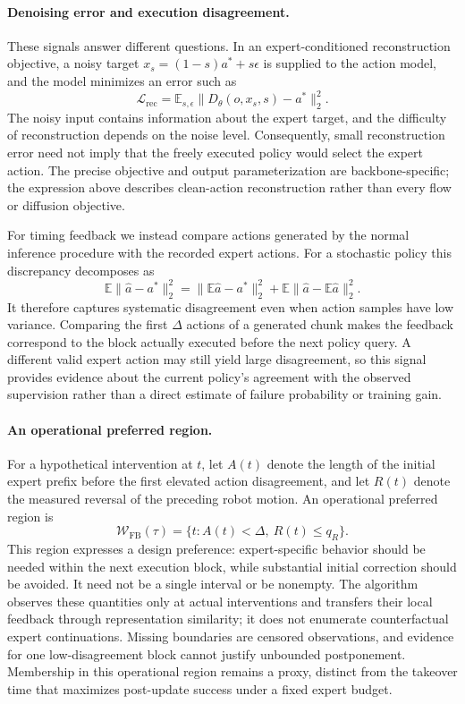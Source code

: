 \paragraph{Denoising error and execution disagreement.}
These signals answer different questions. In an expert-conditioned
reconstruction objective, a noisy target
$x_s=(1-s)a^*+s\epsilon$ is supplied to the action model, and the model
minimizes an error such as
\begin{equation}
\mathcal L_{\mathrm{rec}}
=\mathbb E_{s,\epsilon}
  \|D_\theta(o,x_s,s)-a^*\|_2^2.
\end{equation}
The noisy input contains information about the expert target, and the
difficulty of reconstruction depends on the noise level. Consequently,
small reconstruction error need not imply that the freely executed policy
would select the expert action. The precise objective and output
parameterization are backbone-specific; the expression above describes
clean-action reconstruction rather than every flow or diffusion objective.

For timing feedback we instead compare actions generated by the normal
inference procedure with the recorded expert actions. For a stochastic
policy this discrepancy decomposes as
\begin{equation}
\mathbb E\|\widehat a-a^*\|_2^2
=\|\mathbb E\widehat a-a^*\|_2^2
 +\mathbb E\|\widehat a-\mathbb E\widehat a\|_2^2.
\end{equation}
It therefore captures systematic disagreement even when action samples
have low variance. Comparing the first $\Delta$ actions of a generated
chunk makes the feedback correspond to the block actually executed before
the next policy query. A different valid expert action may still yield
large disagreement, so this signal provides evidence about the current
policy's agreement with the observed supervision rather than a direct
estimate of failure probability or training gain.

\paragraph{An operational preferred region.}
For a hypothetical intervention at $t$, let $A(t)$ denote the length of
the initial expert prefix before the first elevated action disagreement,
and let $R(t)$ denote the measured reversal of the preceding robot motion.
An operational preferred region is
\begin{equation}
\mathcal W_{\mathrm{FB}}(\tau)
=\{t:A(t)<\Delta,\ R(t)\le q_R\}.
\end{equation}
This region expresses a design preference: expert-specific behavior should
be needed within the next execution block, while substantial initial
correction should be avoided. It need not be a single interval or be
nonempty. The algorithm observes these quantities only at actual
interventions and transfers their local feedback through representation
similarity; it does not enumerate counterfactual expert continuations.
Missing boundaries are censored observations, and evidence for one
low-disagreement block cannot justify unbounded postponement. Membership
in this operational region remains a proxy, distinct from the takeover
time that maximizes post-update success under a fixed expert budget.

